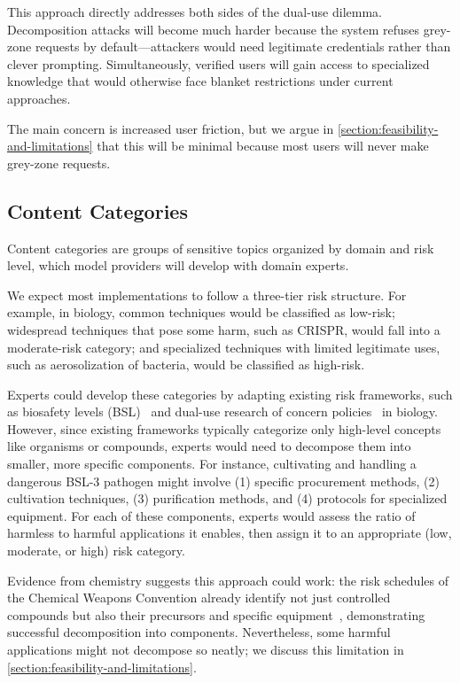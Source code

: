 \documentclass{article}
\theoremstyle{plain}
\theoremstyle{definition}
\theoremstyle{remark}
\begin{document}
This approach directly addresses both sides of the dual-use dilemma.
Decomposition attacks will become much harder because the system refuses grey-zone requests by default—attackers would need legitimate credentials rather than clever prompting.
Simultaneously, verified users will gain access to specialized knowledge that would otherwise face blanket restrictions under current approaches.

The main concern is increased user friction, but we argue in \cref{section:feasibility-and-limitations} that this will be minimal because most users will never make grey-zone requests.


\subsection{Content Categories} \label{section:content-categories}

Content categories are groups of sensitive topics organized by domain and risk level, which model providers will develop with domain experts.

We expect most implementations to follow a three-tier risk structure.
For example, in biology, common techniques would be classified as low-risk;
widespread techniques that pose some harm, such as CRISPR, would fall into a moderate-risk category;
and specialized techniques with limited legitimate uses, such as aerosolization of bacteria, would be classified as high-risk.

Experts could develop these categories by adapting existing risk frameworks, such as biosafety levels (BSL)~\cite{CDC_BMBL_2020} and dual-use research of concern policies~\cite{USG_DURC_2012} in biology.
However, since existing frameworks typically categorize only high-level concepts like organisms or compounds, experts would need to decompose them into smaller, more specific components.
For instance, cultivating and handling a dangerous BSL-3 pathogen might involve (1) specific procurement methods, (2) cultivation techniques, (3) purification methods, and (4) protocols for specialized equipment.
For each of these components, experts would assess the ratio of harmless to harmful applications it enables, then assign it to an appropriate (low, moderate, or high) risk category.

Evidence from chemistry suggests this approach could work: the risk schedules of the Chemical Weapons Convention already identify not just controlled compounds but also their precursors and specific equipment~\cite{OPCW_CWC_1993}, demonstrating successful decomposition into components.
Nevertheless, some harmful applications might not decompose so neatly; we discuss this limitation in \cref{section:feasibility-and-limitations}.
\end{document}
